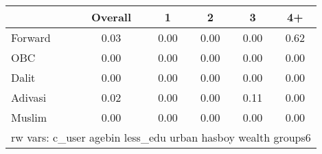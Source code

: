 \begin{tabular}{l*{5}{c}}
\toprule
            &\multicolumn{1}{c}{Overall}&\multicolumn{1}{c}{1}&\multicolumn{1}{c}{2}&\multicolumn{1}{c}{3}&\multicolumn{1}{c}{4+}\\
\midrule
\midrule
Forward     &        0.03&        0.00&        0.00&        0.00&        0.62\\
OBC         &        0.00&        0.00&        0.00&        0.00&        0.00\\
Dalit       &        0.00&        0.00&        0.00&        0.00&        0.00\\
Adivasi     &        0.02&        0.00&        0.00&        0.11&        0.00\\
Muslim      &        0.00&        0.00&        0.00&        0.00&        0.00\\
\bottomrule
\multicolumn{6}{l}{\footnotesize rw vars: c\_user agebin less\_edu urban hasboy wealth groups6}\\
\end{tabular}
